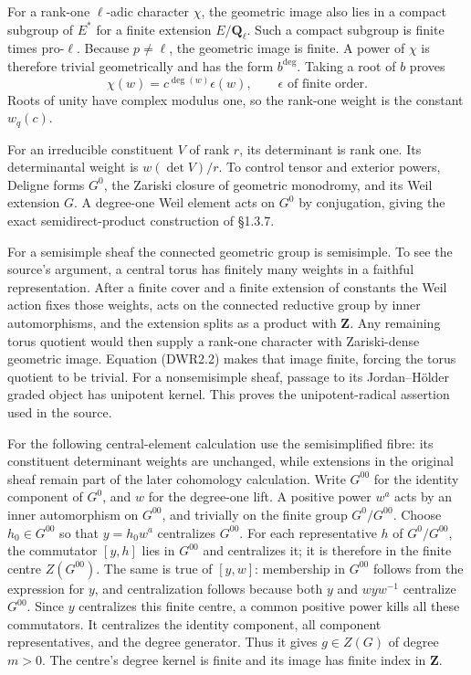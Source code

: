 For a rank-one \(\ell\)-adic character \(\chi\), the geometric image
also lies in a compact subgroup of \(E^*\) for a finite extension
\(E/\mathbf Q_\ell\). Such a compact subgroup is finite times
pro-\(\ell\). Because \(p\ne\ell\), the geometric image is finite. A
power of \(\chi\) is therefore trivial geometrically and has the form
\(b^{\deg}\). Taking a root of \(b\) proves \[
\chi(w)=c^{\deg(w)}\epsilon(w),\qquad\epsilon\text{ of finite order}.
\tag{DWR2.2}
\] Roots of unity have complex modulus one, so the rank-one weight is
the constant \(w_q(c)\).

For an irreducible constituent \(V\) of rank \(r\), its determinant is
rank one. Its determinantal weight is \(w(\det V)/r\). To control tensor
and exterior powers, Deligne forms \(G^0\), the Zariski closure of
geometric monodromy, and its Weil extension \(G\). A degree-one Weil
element acts on \(G^0\) by conjugation, giving the exact
semidirect-product construction of §1.3.7.

For a semisimple sheaf the connected geometric group is semisimple. To
see the source's argument, a central torus has finitely many weights in
a faithful representation. After a finite cover and a finite extension
of constants the Weil action fixes those weights, acts on the connected
reductive group by inner automorphisms, and the extension splits as a
product with \(\mathbf Z\). Any remaining torus quotient would then
supply a rank-one character with Zariski-dense geometric image. Equation
(DWR2.2) makes that image finite, forcing the torus quotient to be
trivial. For a nonsemisimple sheaf, passage to its Jordan--Hölder graded
object has unipotent kernel. This proves the unipotent-radical assertion
used in the source.

For the following central-element calculation use the semisimplified
fibre: its constituent determinant weights are unchanged, while
extensions in the original sheaf remain part of the later cohomology
calculation. Write \(G^{00}\) for the identity component of \(G^0\), and
\(w\) for the degree-one lift. A positive power \(w^a\) acts by an inner
automorphism on \(G^{00}\), and trivially on the finite group
\(G^0/G^{00}\). Choose \(h_0\in G^{00}\) so that \(y=h_0w^a\)
centralizes \(G^{00}\). For each representative \(h\) of \(G^0/G^{00}\),
the commutator \([y,h]\) lies in \(G^{00}\) and centralizes it; it is
therefore in the finite centre \(Z(G^{00})\). The same is true of
\([y,w]\): membership in \(G^{00}\) follows from the expression for
\(y\), and centralization follows because both \(y\) and \(wyw^{-1}\)
centralize \(G^{00}\). Since \(y\) centralizes this finite centre, a
common positive power kills all these commutators. It centralizes the
identity component, all component representatives, and the degree
generator. Thus it gives \(g\in Z(G)\) of degree \(m>0\). The centre's
degree kernel is finite and its image has finite index in \(\mathbf Z\).

